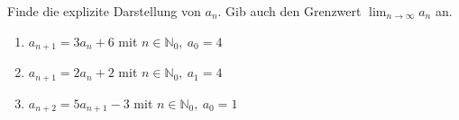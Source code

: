 \documentclass[11pt, a4paper]{article}
\newcommand\braces[1]{\left(#1\right)}
\newif\ifshowsolution
\begin{document}
Finde die explizite Darstellung von $a_n$. Gib auch den Grenzwert $\lim_{n \rightarrow \infty} a_n$ an.
\begin{enumerate}
	\item $a_{n+1} = 3 a_n + 6$ mit $n \in \mathbb{N}_0,\ a_0 = 4$ \label{DGLAufgabe1}
	
	\ifshowsolution
		$q=3 (\neq 1), \quad d=6$
		\begin{align*}
			a_n &= 4 \cdot 3^n + 6 \frac{1-3^n}{1-3} \\
			a_n &= 4 \cdot 3^n - 3 (1-3^n) \\
			a_n &= 4 \cdot 3^n - 3 + 3 \cdot 3^n \\
			a_n &= 7 \cdot 3^n - 3 \tag{Explizite Darstellung}
		\end{align*}
		$\lim_{n \rightarrow \infty} 7 \cdot 3^n - 3 = +\infty$
	\fi
		
	\item $a_{n+1} = 2 a_n +2$ mit $n \in \mathbb{N}_0,\ a_1 = 4$
	
	\ifshowsolution
		$q=2, \quad d=2 \quad a_0 = ?$ \\
		Wir haben $a_1$ gegeben, brauchen aber $a_0$. Setze $n$ so ein, dass in der Formel sowohl $a_1$ als auch $a_0$ vorkommen. Dann kann nach $a_0$ umgestellt werden.
		\begin{align*}
			a_1 &= 2 a_0 +2 \\
			4 &= 2 a_0 +2 \\
			1 &= a_0
		\end{align*}
		Nun weiter wie bei \ref{DGLAufgabe1}:
		\begin{align*}
			a_n &= 1 \cdot 2^n + 2 \cdot \frac{1-2^n}{1-2} \\
			a_n &= 2^n - 2 \cdot \braces{1-2^n} \\
			a_n &= 2^n - 2 + 2 \cdot 2^n \\
			a_n &= 3 \cdot 2^n - 2
		\end{align*}
		$\lim_{n \rightarrow \infty} 3 \cdot 2^n - 2 = +\infty$
	\fi
		
	\item $a_{n+2} = 5 a_{n+1} - 3$ mit $n \in \mathbb{N}_0,\ a_0 = 1$
	
	\ifshowsolution
		\begin{align*}
			a_{n+1} &= 5 a_{n} - 3 \tag{Index-Shift} \\
			q &= 5, \quad d = -3 \\
			a_n &= 1 \cdot 5^n -3 \cdot \frac{1-5^n}{1-5} \\
			a_n &= 5^n + \frac{3}{4} \cdot (1-5^n) \\
			a_n &= \frac{5^n+3}{4}
		\end{align*}
		$\lim_{n \rightarrow \infty} \frac{5^n+3}{4} = +\infty$
	\fi
		

\end{enumerate}
\end{document}
